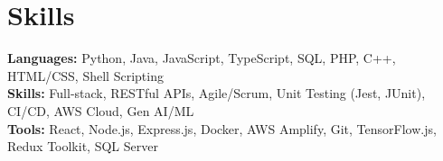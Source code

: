 \documentclass[11pt]{article}       %
\begin{document}

\vspace{-18.5pt}


\section*{Skills}
\textbf{Languages:} Python, Java, JavaScript, TypeScript, SQL, PHP, C++, HTML/CSS, Shell Scripting\\
\textbf{Skills:} Full-stack, RESTful APIs, Agile/Scrum, Unit Testing (Jest, JUnit), CI/CD, AWS Cloud, Gen AI/ML\\
\textbf{Tools:} React, Node.js, Express.js, Docker, AWS Amplify, Git, TensorFlow.js, Redux Toolkit, SQL Server\\

\vspace{-6.5pt}
\end{document}
